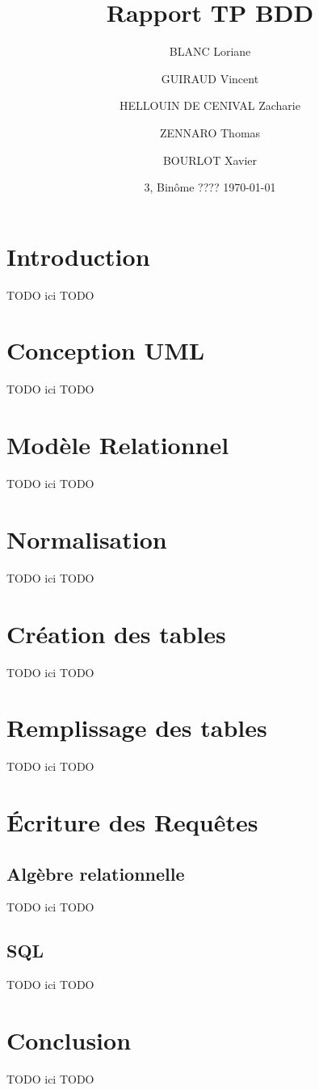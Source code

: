 \documentclass[french]{article}
\title{Rapport TP BDD}
\author{ BLANC Loriane \and GUIRAUD Vincent \and HELLOUIN DE CENIVAL Zacharie \and ZENNARO Thomas \and  BOURLOT Xavier}
\date{3\bsc{Imacs-ae-c}, Binôme ???? \bigbreak \today}
\begin{document}
\maketitle

\tableofcontents

\newpage

\section{Introduction}
TODO ici TODO
\section{Conception UML}
TODO ici TODO
\section{Modèle Relationnel}
TODO ici TODO
\section{Normalisation}
TODO ici TODO
\section{Création des tables}
TODO ici TODO
\section{Remplissage des tables}
TODO ici TODO
\section{Écriture des Requêtes}
\subsection{Algèbre relationnelle}
TODO ici TODO
\subsection{SQL}
TODO ici TODO

\begin{figure}
 
\caption{}
\end{figure} 

\section{Conclusion}
TODO ici TODO
\end{document}
